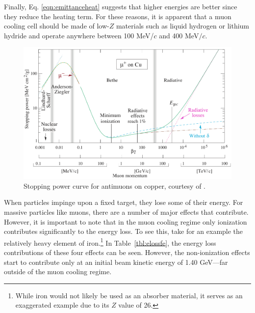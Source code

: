 \fi
Finally, Eq. \eqref{eqn:emittanceheat} suggests that higher energies are better since they reduce the heating term. For these reasons, it is apparent that a muon cooling cell should be made of low-$Z$ materials such as liquid hydrogen or lithium hydride and operate anywhere between 100 MeV/$c$ and 400 MeV$/c$.

\begin{figure}
  \centering
    \includegraphics[width=\textwidth]{Figures/bethecurve} 
  \caption[Stopping power curve for antimuons on copper.]{Stopping power curve for antimuons on copper, courtesy of \cite{PDG}. }
  \label{fig:bethecurve}
\end{figure}

When particles impinge upon a fixed target, they lose some of their energy. For massive particles like muons, there are a number of major effects that contribute. However, it is important to note that in the muon cooling regime only ionization contributes significantly to the energy loss. To see this, take for an example the relatively heavy element of iron.\footnote{While iron would not likely be used as an absorber material, it serves as an exaggerated example due to its $Z$ value of 26.} In Table~\ref{tbl:elossfe}, the energy loss contributions of these four effects can be seen. However, the non-ionization effects start to contribute only at an initial beam kinetic energy of 1.40 GeV---far outside of the muon cooling regime.

